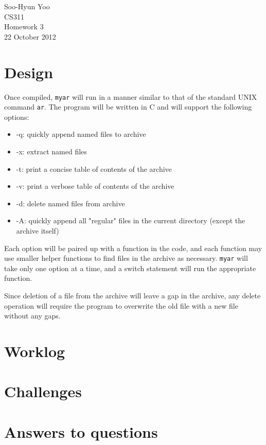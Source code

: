 \documentclass[12pt,letterpaper]{article}
\begin{document}
Soo-Hyun Yoo \\
CS311 \\
Homework 3 \\
22 October 2012


\section*{Design}

Once compiled, {\tt myar} will run in a manner similar to that of the standard
UNIX command {\tt ar}. The program will be written in C and will support the
following options:

\begin{itemize}
	\item -q: quickly append named files to archive
	\item -x: extract named files
	\item -t: print a concise table of contents of the archive
	\item -v: print a verbose table of contents of the archive
	\item -d: delete named files from archive
	\item -A: quickly append all "regular" files in the current directory
		(except the archive itself)
\end{itemize}

Each option will be paired up with a function in the code, and each function may use smaller helper functions to find files in the archive as necessary. {\tt myar} will take only one option at a time, and a switch statement will run the appropriate function.

Since deletion of a file from the archive will leave a gap in the archive, any delete operation will require the program to overwrite the old file with a new file without any gaps.


\section*{Worklog}


\section*{Challenges}


\section*{Answers to questions}
\end{document}
